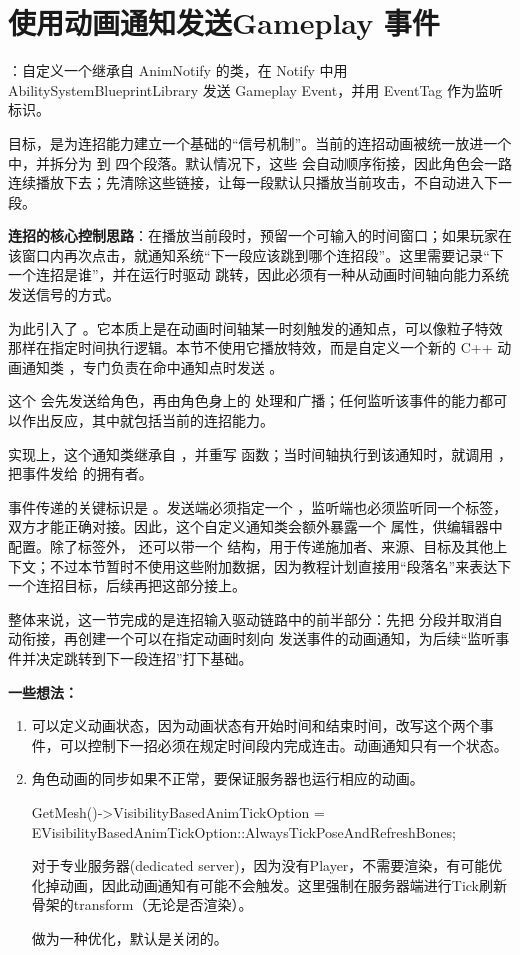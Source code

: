 \section{使用动画通知发送Gameplay 事件}
：自定义一个继承自 AnimNotify 的类，在 Notify 中用 AbilitySystemBlueprintLibrary 发送 Gameplay Event，并用 EventTag 作为监听标识。

目标，是为连招能力建立一个基础的“信号机制”。当前的连招动画被统一放进一个  中，并拆分为  到  四个段落。默认情况下，这些  会自动顺序衔接，因此角色会一路连续播放下去；先清除这些链接，让每一段默认只播放当前攻击，不自动进入下一段。

\textbf{连招的核心控制思路}：在播放当前段时，预留一个可输入的时间窗口；如果玩家在该窗口内再次点击，就通知系统“下一段应该跳到哪个连招段”。这里需要记录“下一个连招是谁”，并在运行时驱动  跳转，因此必须有一种从动画时间轴向能力系统发送信号的方式。

为此引入了 。它本质上是在动画时间轴某一时刻触发的通知点，可以像粒子特效那样在指定时间执行逻辑。本节不使用它播放特效，而是自定义一个新的 C++ 动画通知类 ，专门负责在命中通知点时发送 。

这个  会先发送给角色，再由角色身上的  处理和广播；任何监听该事件的能力都可以作出反应，其中就包括当前的连招能力。

实现上，这个通知类继承自 ，并重写  函数；当时间轴执行到该通知时，就调用 ，把事件发给  的拥有者。

事件传递的关键标识是 。发送端必须指定一个 ，监听端也必须监听同一个标签，双方才能正确对接。因此，这个自定义通知类会额外暴露一个  属性，供编辑器中配置。除了标签外， 还可以带一个  结构，用于传递施加者、来源、目标及其他上下文；不过本节暂时不使用这些附加数据，因为教程计划直接用“段落名”来表达下一个连招目标，后续再把这部分接上。

整体来说，这一节完成的是连招输入驱动链路中的前半部分：先把  分段并取消自动衔接，再创建一个可以在指定动画时刻向  发送事件的动画通知，为后续“监听事件并决定跳转到下一段连招”打下基础。

\textbf{一些想法：}
\begin{enumerate}
	\item 可以定义动画状态，因为动画状态有开始时间和结束时间，改写这个两个事件，可以控制下一招必须在规定时间段内完成连击。动画通知只有一个状态。
	\item 角色动画的同步如果不正常，要保证服务器也运行相应的动画。
	\begin{code}
		GetMesh()->VisibilityBasedAnimTickOption = EVisibilityBasedAnimTickOption::AlwaysTickPoseAndRefreshBones;
	\end{code}
	对于专业服务器(dedicated server)，因为没有Player，不需要渲染，有可能优化掉动画，因此动画通知有可能不会触发。这里强制在服务器端进行Tick刷新骨架的transform（无论是否渲染）。
	\begin{marker}
		做为一种优化，默认是关闭的。
	\end{marker}	
\end{enumerate}
